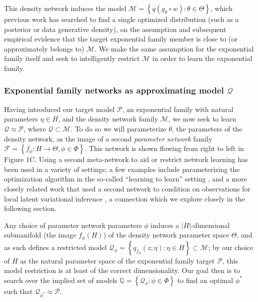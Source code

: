 \documentclass[twoside]{article}
\begin{document}
This density network induces the model $\mathcal{M} = \left\{ q(g_\theta \circ w) : \theta \in \Theta \right\}$, which previous work has searched to find a single optimized distribution (such as a posterior or data generative density), on the assumption and subsequent empirical evidence that the target exponential family member is close to (or approximately belongs to) $\mathcal{M}$.   We make the same assumption for the exponential family itself and seek to intelligently restrict $\mathcal{M}$ in order to learn the exponential family.  

\subsubsection{Exponential family networks as approximating model $\mathcal{Q}$}

Having introduced our target model $\mathcal{P}$, an exponential family with natural parameters $\eta \in H$, and the density network family $\mathcal{M}$, we now seek to learn $\mathcal{Q} \approx \mathcal{P}$, where $\mathcal{Q} \subset \mathcal{M}$.  
To do so we will parameterize $\theta$, the parameters of the density network, as the image of a second \emph{parameter network} family $\mathcal{F} = \left\{ f_\phi : H \rightarrow \Theta, \phi \in \Phi\right\}$.   
This network is shown flowing from right to left in Figure 1C.  
Using a second meta-network to aid or restrict network learning has been used in a variety of settings; a few examples include parameterizing the optimization algorithm in the so-called ``learning to learn'' setting \cite{andrychowicz2016learning}, and a more closely related work that used a second network to condition on observations for local latent variational inference \cite{rezende2015variational}, a connection which we explore closely in the following section.

Any choice of parameter network parameters $\phi$ induces a $|H|$-dimensional submanifold (the image $f_\phi(H)$) of the density network parameter space $\Theta$, and as such defines a restricted model $\mathcal{Q}_\phi = \left\{ q_{f_{\phi}}(z; \eta): \eta \in H\right\} \subset \mathcal{M}$; by our choice of $H$ as the natural parameter space of the exponential family target $\mathcal{P}$, this model restriction is at least of the correct dimensionality.
Our goal then is to search over the implied set of models $\mathbb{Q} = \left\{ \mathcal{Q}_\phi : \phi \in \Phi \right\}$ to find an optimal $\phi^*$ such that $\mathcal{Q}_{\phi^*} \approx \mathcal{P}$. 
\end{document}
